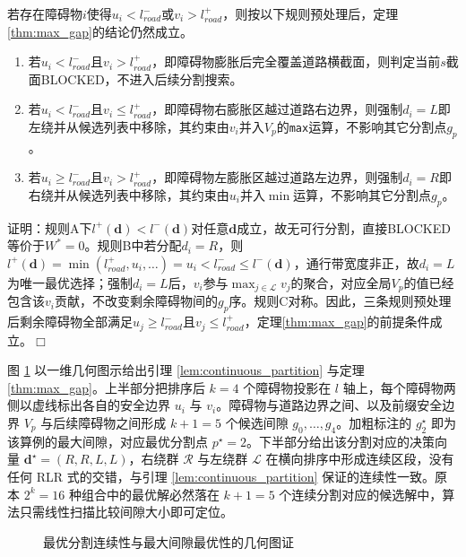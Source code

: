 \begin{lemma}[越界障碍物的预处理规则]
\label{lem:boundary_trim}

若存在障碍物$i$使得$u_i < l_{road}^{-}$或$v_i > l_{road}^{+}$，则按以下规则预处理后，定理\ref{thm:max_gap}的结论仍然成立。

\begin{enumerate}
\item 若$u_i < l_{road}^{-}$且$v_i > l_{road}^{+}$，即障碍物膨胀后完全覆盖道路横截面，则判定当前$s$截面BLOCKED，不进入后续分割搜索。
\item 若$u_i < l_{road}^{-}$且$v_i \leq l_{road}^{+}$，即障碍物右膨胀区越过道路右边界，则强制$d_i = L$即左绕并从候选列表中移除，其约束由$v_i$并入$V_p$的\texttt{max}运算，不影响其它分割点$g_p$。
\item 若$u_i \geq l_{road}^{-}$且$v_i > l_{road}^{+}$，即障碍物左膨胀区越过道路左边界，则强制$d_i = R$即右绕并从候选列表中移除，其约束由$u_i$并入$\min$运算，不影响其它分割点$g_p$。
\end{enumerate}
\end{lemma}

证明：规则A下$l^{+}(\mathbf{d}) < l^{-}(\mathbf{d})$对任意$\mathbf{d}$成立，故无可行分割，直接BLOCKED等价于$W^{*} = 0$。规则B中若分配$d_i = R$，则$l^{+}(\mathbf{d}) = \min(l_{road}^{+}, u_i, \ldots) = u_i < l_{road}^{-} \leq l^{-}(\mathbf{d})$，通行带宽度非正，故$d_i = L$为唯一最优选择；强制$d_i = L$后，$v_i$参与$\max_{j\in\mathcal{L}}v_j$的聚合，对应全局$V_p$的值已经包含该$v_i$贡献，不改变剩余障碍物间的$g_p$序。规则C对称。因此，三条规则预处理后剩余障碍物全部满足$u_j \geq l_{road}^{-}$且$v_j \leq l_{road}^{+}$，定理\ref{thm:max_gap}的前提条件成立。\hfill$\Box$

图 \ref{fig:max_gap_theorem} 以一维几何图示给出引理 \ref{lem:continuous_partition} 与定理 \ref{thm:max_gap}。上半部分把排序后 $k=4$ 个障碍物投影在 $l$ 轴上，每个障碍物两侧以虚线标出各自的安全边界 $u_i$ 与 $v_i$。障碍物与道路边界之间、以及前缀安全边界 $V_p$ 与后续障碍物之间形成 $k+1=5$ 个候选间隙 $g_0,\ldots,g_4$。加粗标注的 $g_2^\star$ 即为该算例的最大间隙，对应最优分割点 $p^\star=2$。下半部分给出该分割对应的决策向量 $\mathbf{d}^\star=(R,R,L,L)$，右绕群 $\mathcal{R}$ 与左绕群 $\mathcal{L}$ 在横向排序中形成连续区段，没有任何 RLR 式的交错，与引理 \ref{lem:continuous_partition} 保证的连续性一致。原本 $2^k=16$ 种组合中的最优解必然落在 $k+1=5$ 个连续分割对应的候选解中，算法只需线性扫描比较间隙大小即可定位。

\begin{figure}[htbp]
\centering
{}
\caption{最优分割连续性与最大间隙最优性的几何图证}
\label{fig:max_gap_theorem}
\end{figure}

